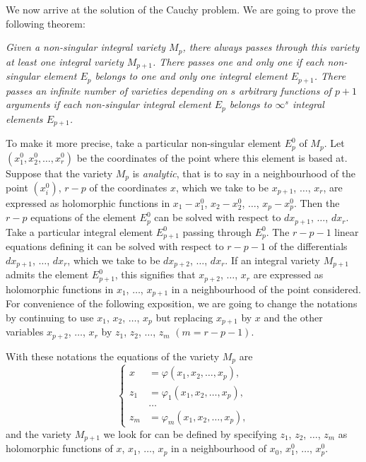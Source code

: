 \documentclass[leqno,11pt]{book}
\makeatletter
\theoremstyle{shape1}
\theoremstyle{shapesmall}
\let\old@phi\phi
\let\old@varphi\varphi
\let\phi\old@varphi
\let\varphi\old@phi
\newcommand{\somespace}{\vspace{9pt}}
\makeatother
\begin{document}
We now arrive at the solution of the Cauchy problem. We are going to prove the following theorem:

\somespace

\emph{Given a non-singular integral variety $M_{p}$, there always passes through this variety at least one integral variety $M_{p+1}$. There passes one and only one if each non-singular element $E_{p}$ belongs to one and only one integral element $E_{p+1}$. There passes an infinite number of varieties depending on $s$ arbitrary functions of $p+1$ arguments if each non-singular integral element $E_{p}$ belongs to $\infty^{s}$ integral elements $E_{p+1}$.}

\somespace

To make it more precise, take a particular non-singular element $E_{p}^{0}$ of $M_{p}$. Let $(x_{1}^{0},x_{2}^{0},\dots,x_{r}^{0})$ be the coordinates of the point where this element is based at. Suppose that the variety $M_{p}$ is \emph{analytic}, that is to say in a neighbourhood of the point $(x_{i}^{0})$, $r-p$ of the coordinates $x$, which we take to be $x_{p+1}$, $\dots$, $x_{r}$, are expressed as holomorphic functions in $x_{1}-x_{1}^{0}$, $x_{2}-x_{2}^{0}$, $\dots$, $x_{p}-x_{p}^{0}$. Then the $r-p$ equations of the element $E_{p}^{0}$ can be solved with respect to $dx_{p+1}$, $\dots$, $dx_{r}$. Take a particular integral element $E_{p+1}^{0}$ passing through $E_{p}^{0}$. The $r-p-1$ linear equations defining it can be solved with respect to $r-p-1$ of the differentials $dx_{p+1}$, $\dots$, $dx_{r}$, which we take to be $dx_{p+2}$, $\dots$, $dx_{r}$. If an integral variety $M_{p+1}$ admits the element $E_{p+1}^{0}$, this signifies that $x_{p+2}$, $\dots$, $x_{r}$ are expressed as holomorphic functions in $x_{1}$, $\dots$, $x_{p+1}$ in a neighbourhood of the point considered. For convenience of the following exposition, we are going to change the notations by continuing to use $x_{1}$, $x_{2}$, $\dots$, $x_{p}$ but replacing $x_{p+1}$ by $x$ and the other variables $x_{p+2}$, $\dots$, $x_{r}$ by $z_{1}$, $z_{2}$, $\dots$, $z_{m}$ $(m=r-p-1)$.

With these notations the equations of the variety $M_{p}$ are
\begin{equation}
  \label{eq:4}
  \left\{
    \begin{aligned}
      x&=\phi(x_{1},x_{2},\dots,x_{p}),\\
      z_{1}&=\phi_{1}(x_{1},x_{2},\dots,x_{p}),\\
      &\dots\\
      z_{m}&=\phi_{m}(x_{1},x_{2},\dots,x_{p}),
    \end{aligned}
  \right.
\end{equation}
and the variety $M_{p+1}$ we look for can be defined by specifying $z_{1}$, $z_{2}$, $\dots$, $z_{m}$ as holomorphic functions of $x$, $x_{1}$, $\dots$, $x_{p}$ in a neighbourhood of $x_{0}$, $x_{1}^{0}$, $\dots$, $x_{p}^{0}$.
\end{document}
